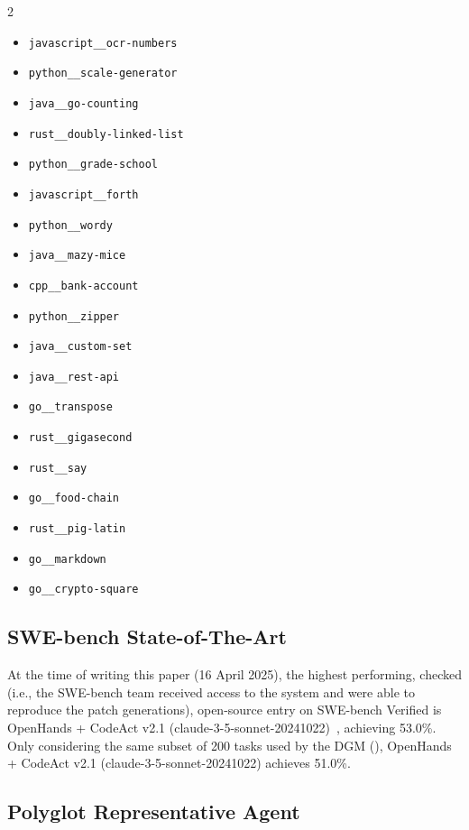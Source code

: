 \documentclass{article}
\begin{document}
\begin{multicols}{2}
\begin{itemize}
    \item \texttt{javascript\_\_ocr-numbers}
    \item \texttt{python\_\_scale-generator}
    \item \texttt{java\_\_go-counting}
    \item \texttt{rust\_\_doubly-linked-list}
    \item \texttt{python\_\_grade-school}
    \item \texttt{javascript\_\_forth}
    \item \texttt{python\_\_wordy}
    \item \texttt{java\_\_mazy-mice}
    \item \texttt{cpp\_\_bank-account}
    \item \texttt{python\_\_zipper}
    \item \texttt{java\_\_custom-set}
    \item \texttt{java\_\_rest-api}
    \item \texttt{go\_\_transpose}
    \item \texttt{rust\_\_gigasecond}
    \item \texttt{rust\_\_say}
    \item \texttt{go\_\_food-chain}
    \item \texttt{rust\_\_pig-latin}
    \item \texttt{go\_\_markdown}
    \item \texttt{go\_\_crypto-square}
\end{itemize}
\end{multicols}


\subsection{SWE-bench State-of-The-Art}
\label{app:swebench-sota}
At the time of writing this paper (16 April 2025), the highest performing, checked (i.e., the SWE-bench team received access to the system and were able to reproduce the patch generations), open-source entry on SWE-bench Verified is OpenHands + CodeAct v2.1 (claude-3-5-sonnet-20241022)~\citep{wang2024openhands}, achieving 53.0\%. Only considering the same subset of 200 tasks used by the DGM (), OpenHands + CodeAct v2.1 (claude-3-5-sonnet-20241022) achieves 51.0\%.

\subsection{Polyglot Representative Agent}
\label{app:polyglot-sota}
\end{document}
